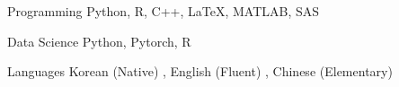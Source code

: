 

\begin{cvskills}

  \cvskill
    {Programming} %
    {Python, R, C++, LaTeX, MATLAB, SAS} %

  \cvskill
    {Data Science} %
    {Python, Pytorch, R} %


  \cvskill
    {Languages} %
    {Korean (Native) , English (Fluent) , Chinese (Elementary)} %

\end{cvskills}
